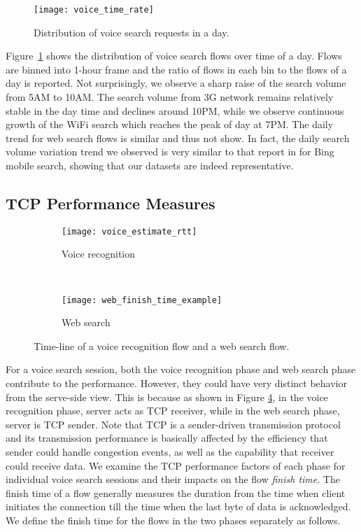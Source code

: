 \begin{figure}[th]
\centering
\texttt{[image: voice\_time\_rate]}
\caption{Distribution of voice search requests in a day.}
\label{fig:voice_time_rate}
\end{figure}

Figure~\ref{fig:voice_time_rate} shows the distribution of voice search flows over time of a day. Flows are binned into 1-hour frame and the ratio of flows in each bin to the flows of a day is reported. Not surprisingly, we observe a sharp raise of the search volume from 5AM to 10AM. The search volume from 3G network remains relatively stable in the day time and declines around 10PM, while we observe continuous growth of the WiFi search which reaches the peak of day at 7PM. The daily trend for web search flows is similar and thus not show. In fact, the daily search volume variation trend we observed is very similar to that report in \cite{Song:2013:EEU:2488388.2488493} for Bing mobile search, showing that our datasets are indeed representative.

\subsection{TCP Performance Measures}

\begin{figure}[ht]
\centering
\begin{subfigure}[b]{0.6\linewidth}
	\texttt{[image: voice\_estimate\_rtt]}
\caption{Voice recognition}
\label{fig:voice_estimate_rtt}
\end{subfigure} \\
\begin{subfigure}[b]{0.6\linewidth}
	\texttt{[image: web\_finish\_time\_example]}
\caption{Web search}
\label{fig:web_finish_time_example}
\end{subfigure}
\caption{Time-line of a voice recognition flow and a web search flow.}
\label{fig:time_line}
\end{figure}


For a voice search session, both the voice recognition phase and web search phase contribute to the performance. However, they could have very distinct behavior from the serve-side view. This is because as shown in Figure \ref{fig:time_line}, in the voice recognition phase, server acts as TCP receiver, while in the web search phase, server is TCP sender. Note that TCP is a sender-driven transmission protocol and its transmission performance is basically affected by the efficiency that sender could handle congestion events, as well as the capability that receiver could receive data. We examine the TCP performance factors of each phase for individual voice search sessions and their impacts on the flow \emph{finish time}. The finish time of a flow generally measures the duration from the time when client initiates the connection till the time when the last byte of data is acknowledged. We define the finish time for the flows in the two phases separately as follows.

